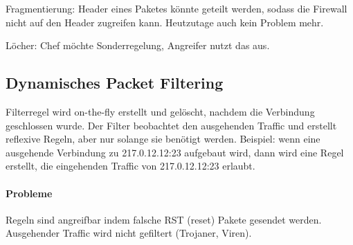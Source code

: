 Fragmentierung: Header eines Paketes könnte geteilt werden, sodass die Firewall nicht auf
den Header zugreifen kann.
Heutzutage auch kein Problem mehr.

Löcher: Chef möchte Sonderregelung, Angreifer nutzt das aus.

\subsection{Dynamisches Packet Filtering}%
\label{sub:dynamisches_packet_filtering}

Filterregel wird on-the-fly erstellt und gelöscht, nachdem die Verbindung geschlossen
wurde.
Der Filter beobachtet den ausgehenden Traffic und erstellt reflexive Regeln, aber nur
solange sie benötigt werden.
Beispiel: wenn eine ausgehende Verbindung zu 217.0.12.12:23 aufgebaut wird, dann wird eine
Regel erstellt, die eingehenden Traffic von 217.0.12.12:23 erlaubt.

\paragraph{Probleme}%

Regeln sind angreifbar indem falsche RST (reset) Pakete gesendet werden.
Ausgehender Traffic wird nicht gefiltert (Trojaner, Viren).

